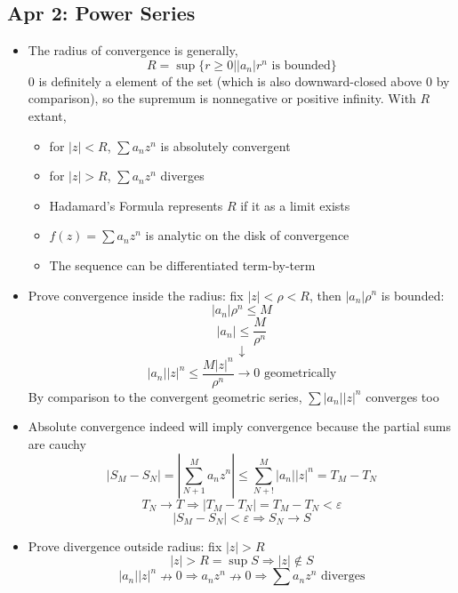 \documentclass[10pt, oneside]{article}
\let\ep\varepsilon
\let\leq\leqslant
\let\geq\geqslant
\begin{document}
\subsection{Apr 2: Power Series}
\begin{itemize}
    \item The radius of convergence is generally, 
            \[R = \sup \{r\geq 0 | |a_n|r^n \text{ is bounded}\}\]
        $0$ is definitely a element of the set (which is also downward-closed above $0$ by comparison), so the supremum is nonnegative or positive infinity. With $R$ extant, \begin{itemize}
            \item for $|z| < R$, $\sum a_n z^n$ is absolutely convergent
            \item for $|z| > R$, $\sum a_n z^n$ diverges
            \item Hadamard's Formula represents $R$ if it as a limit exists
            \item $f(z) = \sum a_n z^n$ is analytic on the disk of convergence
            \item The sequence can be differentiated term-by-term
        \end{itemize}
    \item Prove convergence inside the radius: fix $|z| < \rho < R$, then $|a_n|\rho^n$ is bounded:
            \[|a_n|\rho^n \leq M\]
            \[|a_n| \leq \frac{M}{\rho^n}\]
            \[\downarrow\]
            \[|a_n||z|^n \leq \frac{M|z|^n}{\rho^n} \rightarrow 0 \text{ geometrically}\]
        By comparison to the convergent geometric series, $\sum |a_n||z|^n$ converges too
    \item Absolute convergence indeed will imply convergence because the partial sums are cauchy
            \[|S_M - S_N| = \left|\sum_{N+1}^M a_n z^n\right| \leq \sum_{N+!}^M |a_n| |z|^n = T_M - T_N\]
            \[T_N \rightarrow T \Rightarrow |T_M - T_N| = T_M - T_N < \ep\]
            \[|S_M - S_N| < \ep  \Rightarrow S_N \rightarrow S\]
    \item Prove divergence outside radius: fix $|z| > R$
            \[|z| > R = \sup S \Rightarrow |z| \notin S\]
            \[|a_n||z|^n \nrightarrow 0 \Rightarrow a_n z^n \nrightarrow 0 \Rightarrow \sum a_n z^n \text{ diverges}\]
\end{itemize}
\end{document}
